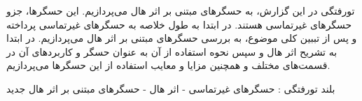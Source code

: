 


\pagestyle{empty}

‌تورفتگی
در این گزارش، به حسگرهای مبتنی بر اثر هال می‌پردازیم. این حسگرها، جزو حسگرهای غیرتماسی هستند. در ابتدا به طول خلاصه به حسگر‌های غیرتماسی پرداخته و پس از تببین کلی موضوع، به بررسی حسگر‌های مبتنی بر اثر هال می‌پردازیم. در ابتدا به تشریح اثر هال و سپس نحوه استفاده از آن به عنوان حسگر و کاربردهای آن در قسمت‌های مختلف و همچنین مزایا و معایب استفاده از این حسگرها می‌پردازیم.

‌بلند
‌تورفتگی : 
حسگرهای غیرتماسی - اثر هال - حسگرهای مبتنی بر اثر هال
‌جدید
